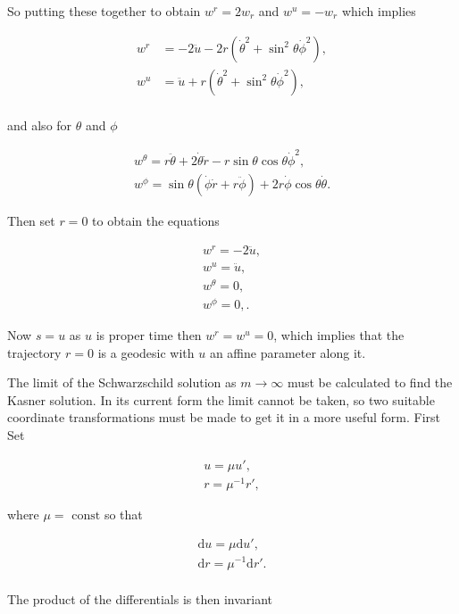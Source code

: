 \noindent So putting these together to obtain $w^{r} = 2w_{r}$ and $w^{u} = -w_{r}$ which implies

\begin{align*}
w^{r} & = -2 \ddot{u} - 2 r(\dot{\theta}^2 + \sin^2{\theta}\dot{\phi}^2), \\
w^{u} & = \ddot{u} + r(\dot{\theta}^2 + \sin^2{\theta}\dot{\phi}^2), \\
\end{align*}

\noindent and also for $\theta$ and $\phi$

\begin{align*}
w^{\theta} = r \ddot{\theta} + 2 \dot{\theta} \dot{r} - r \sin{\theta}\cos{\theta}\dot{\phi}^2, \\
w^{\phi} = \sin{\theta}(\dot{\phi} \dot{r} + r \ddot{\phi}) + 2r \dot{\phi}\cos{\theta} \dot{\theta}.
\end{align*}

\noindent Then set $r=0$ to obtain the equations

\begin{align*} 
w^{r} = - 2 \ddot{u}, \\
w^{u} = \ddot{u}, \\
w^{\theta} = 0, \\
w^{\phi} = 0,.
\end{align*} 

\noindent Now $s = u$ as $u$ is proper time then $w^{r} = w^{u} = 0$, which implies that the trajectory $r=0$ is a geodesic with $u$ an affine parameter along it. 

The limit of the Schwarzschild solution as $m \rightarrow \infty$ must be calculated to find the Kasner solution. In its current form the limit cannot be taken, so two suitable coordinate transformations must be made to get it in a more useful form. First Set 

\begin{gather*} 
u = \mu u', \\
r = {\mu}^{-1} r',   
\end{gather*} 

\noindent where $\mu = \text{ const}$ so that
  
\begin{gather*} 
\mathrm{d}u = \mu \mathrm{d}u', \\
\mathrm{d}r = {\mu}^{-1} \mathrm{d}r'. \\
\end{gather*} 

\noindent The product of the differentials is then invariant

